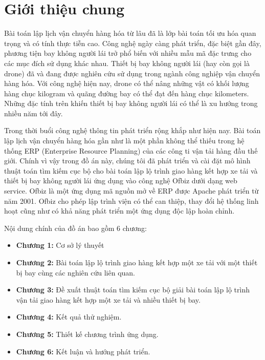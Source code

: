 \documentclass[a4paper,12pt]{report}
\begin{document}
{}
\chapter*{Giới thiệu chung}
Bài toán lập lịch vận chuyển hàng hóa từ lâu đã là lớp bài toán tối ưu hóa quan trọng và có tính thực tiễn cao. Công nghệ ngày càng phát triển, đặc biệt gần đây, phương tiện bay không người lái trở phổ biến với nhiều mẫu mã đặc trưng cho các mục đích sử dụng khác nhau. Thiết bị bay không người lái (hay còn gọi là drone) đã và đang được nghiên cứu sử dụng trong ngành công nghiệp vận chuyển hàng hóa. Với công nghệ hiện nay, drone có thể nâng những vật có khối lượng hàng chục kilogram và quãng đường bay có thể đạt đến hàng chục kilometers. Những đặc tính trên khiến thiết bị bay không người lái có thể là xu hướng trong nhiều năm tới đây.

Trong thời buổi công nghệ thông tin phát triển rộng khắp như hiện nay. Bài toán lập lịch vận chuyển hàng hóa gần như là một phần không thể thiếu trong hệ thống \ac{ERP} (Enterprise Resource Planning) của các công ti vận tải hàng đầu thế giới. Chính vì vậy trong đồ án này, chúng tôi đã phát triển và cài đặt mô hình thuật toán tìm kiếm cục bộ cho bài toán lập lộ trình giao hàng kết hợp xe tải và thiết bị bay không người lái ứng dụng vào công nghệ Ofbiz dưới dạng web service. Ofbiz là một ứng dụng mã nguồn mở về \ac{ERP} được Apache phát triển từ năm 2001. Ofbiz cho phép lập trình viện có thể can thiệp, thay đổi hệ thống linh hoạt cũng như có khả năng phát triển một ứng dụng độc lập hoàn chỉnh. 

Nội dung chính của đồ án bao gồm 6 chương:
\begin{itemize}
\item \textbf{Chương 1:} Cơ sở lý thuyết
\item \textbf{Chương 2:} Bài toán lập lộ trình giao hàng kết hợp một xe tải với một thiết bị bay cùng các nghiên cứu liên quan.
\item \textbf{Chương 3:} Đề xuất thuật toán tìm kiếm cục bộ giải bài toán lập lộ trình vận tải giao hàng kết hợp một xe tải và nhiều thiết bị bay.
\item \textbf{Chương 4:} Kết quả thử nghiệm.
\item \textbf{Chương 5:} Thiết kế chương trình ứng dụng.
\item \textbf{Chương 6:} Kết luận và hướng phát  triển.
\end{itemize}
\end{document}
